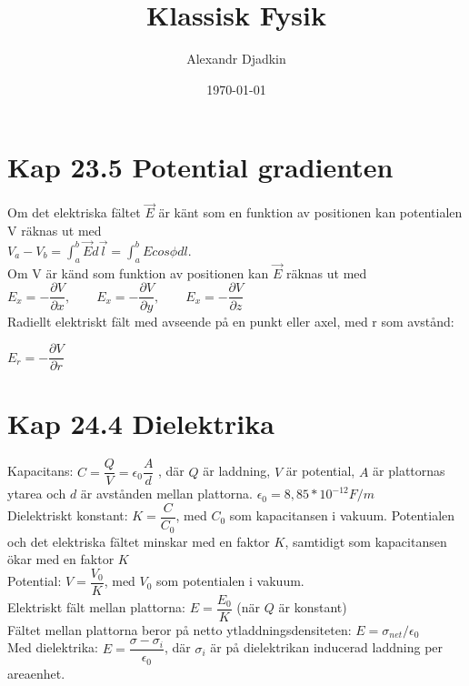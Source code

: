 \documentclass[a4paper]{article}
\title{Klassisk Fysik}
\author{Alexandr Djadkin}
\date{\today}
\begin{document}
\maketitle




\section{Kap 23.5 Potential gradienten}

Om det elektriska fältet $\vec{E}$ är känt som en funktion av positionen kan potentialen V räknas ut med  \\[2mm]

$V_a - V_b = \int_{a}^{b} \vec{E} d\vec{l} = \int_{a}^{b} Ecos\phi dl$. 
\\[2mm]
Om V är känd som funktion av positionen kan $\vec{E}$ räknas ut med 
\\[2mm]

$ E_x = -\dfrac{\partial V}{\partial x}, \qquad E_x = -\dfrac{\partial V}{\partial y}, \qquad E_x = -\dfrac{\partial V}{\partial z}$
\\[2mm]
Radiellt elektriskt fält med avseende på en punkt eller axel, med r som avstånd:

$ E_r = -\dfrac{\partial V}{\partial r}$

\section{Kap 24.4 Dielektrika}

Kapacitans: $ C = \dfrac{Q}{V}=\epsilon_0\dfrac{A}{d}$ , där $Q$ är laddning, $V$ är potential, $A$ är plattornas ytarea och $d$ är avstånden mellan plattorna. $\epsilon_0 = 8,85*10^{-12} F/m$
\\[2mm]
Dielektriskt konstant: $K = \dfrac{C}{C_0}$, med $C_0$ som kapacitansen i vakuum. Potentialen och det elektriska fältet minskar med en faktor $K$, samtidigt som kapacitansen ökar med en faktor $K$
\\[2mm]
Potential: $V = \dfrac{V_0}{K}$, med $V_0$ som potentialen i vakuum.
\\[2mm]
Elektriskt fält mellan plattorna: $E = \dfrac{E_0}{K}$ (när $Q$ är konstant)
\\[1mm]
Fältet mellan plattorna beror på netto ytladdningsdensiteten: 
$E=\sigma_{net}/\epsilon_0$
\\[1mm]
Med dielektrika: $E = \dfrac{\sigma - \sigma_i}{\epsilon_0}$, där $\sigma_i$ är på dielektrikan inducerad laddning per areaenhet.
\newpage
\end{document}
